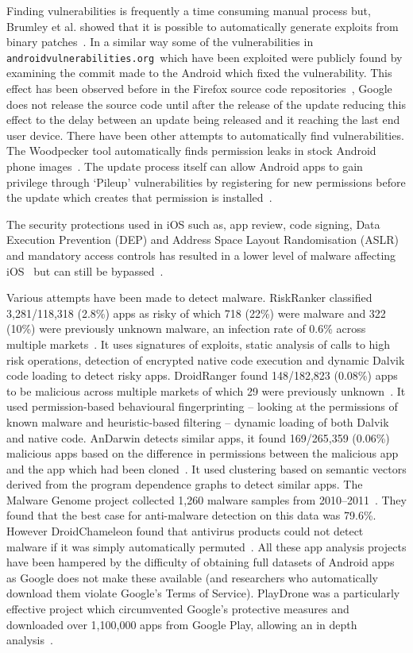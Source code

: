 \documentclass[conference,a4paper,twoside]{IEEEtran}
\let\OldTodo\todo
\renewcommand{\todo}{\OldTodo[inline]}
\newcommand{\todolater}[1]{}%
\newcommand{\avo}{\texttt{androidvulnerabilities.org}}
\begin{document}
Finding vulnerabilities is frequently a time consuming manual process but, Brumley et al. showed that it is possible to automatically generate exploits from binary patches~\cite{Brumley2008}.
In a similar way some of the vulnerabilities\todolater{which?} in \avo\ which have been exploited were publicly found by examining the commit made to the Android which fixed the vulnerability.
This effect has been observed before in the Firefox source code repositories~\cite{Barth2011}, Google does not release the source code until after the release of the update reducing this effect to the delay between an update being released and it reaching the last end user device.
There have been other attempts to automatically find vulnerabilities.
The Woodpecker tool automatically finds permission leaks in stock Android phone images~\cite{Grace2012}.
The update process itself can allow Android apps to gain privilege through `Pileup' vulnerabilities by registering for new permissions before the update which creates that permission is installed~\cite{Xing2014}.

The security protections used in iOS such as, app review, code signing, Data Execution Prevention (DEP) and Address Space Layout Randomisation (ASLR) and mandatory access controls has resulted in a lower level of malware affecting iOS~\cite{Felt2011} but can still be bypassed~\cite{Wang2013a}.

Various attempts have been made to detect malware.
RiskRanker classified 3,281/118,318 (2.8\%) apps as risky of which 718 (22\%) were malware and 322 (10\%) were previously unknown malware, an infection rate of 0.6\% across multiple markets~\cite{Grace2012a}.
It uses signatures of exploits, static analysis of calls to high risk operations, detection of encrypted native code execution and dynamic Dalvik code loading to detect risky apps.
DroidRanger found 148/182,823 (0.08\%) apps to be malicious across multiple markets of which 29 were previously unknown~\cite{Zhou2012a}.
It used permission-based behavioural fingerprinting -- looking at the permissions of known malware and heuristic-based filtering -- dynamic loading of both Dalvik and native code.
AnDarwin detects similar apps, it found 169/265,359 (0.06\%) malicious apps based on the difference in permissions between the malicious app and the app which had been cloned~\cite{Crussell2013}.
It used clustering based on semantic vectors derived from the program dependence graphs to detect similar apps.
The Malware Genome project collected 1,260 malware samples from 2010--2011~\cite{Zhou2012b}.
They found that the best case for anti-malware detection on this data was 79.6\%.
However DroidChameleon found that antivirus products could not detect malware if it was simply automatically permuted~\cite{Rastogi2013}.
All these app analysis projects have been hampered by the difficulty of obtaining full datasets of Android apps as Google does not make these available (and researchers who automatically download them violate Google's Terms of Service).
PlayDrone was a particularly effective project which circumvented Google's protective measures and downloaded over 1,100,000 apps from Google Play, allowing an in depth analysis~\cite{Viennot2014}.
\end{document}
